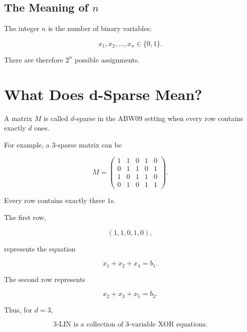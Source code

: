 \documentclass[11pt,a4paper]{article}
\begin{document}


\subsection{The Meaning of \texorpdfstring{$n$}{n}}

The integer $n$ is the number of binary variables:

\begin{equation}
    x_1,x_2,\ldots,x_n\in\{0,1\}.
\end{equation}

There are therefore $2^{n}$ possible assignments.




\section{What Does d-Sparse Mean?}

A matrix $M$ is called $d$-sparse in the ABW09 setting when every
row contains exactly $d$ ones.

For example, a $3$-sparse matrix can be

\begin{equation}
M =
\begin{pmatrix}
1&1&0&1&0\\
0&1&1&0&1\\
1&0&1&1&0\\
0&1&0&1&1
\end{pmatrix}.
\end{equation}

Every row contains exactly three $1$s.

The first row,

\[
(1,1,0,1,0),
\]

represents the equation

\begin{equation}
    x_1+x_2+x_4=b_1.
\end{equation}

The second row represents

\begin{equation}
    x_2+x_3+x_5=b_2.
\end{equation}

Thus, for $d=3$,

\begin{equation}
    \text{3-LIN is a collection of 3-variable XOR equations.}
\end{equation}
\end{document}
